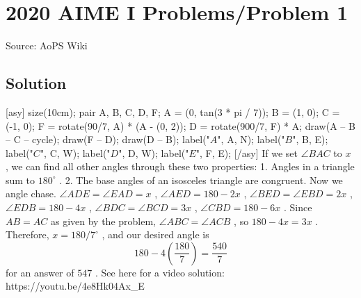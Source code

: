 \documentclass[12pt]{article}
\begin{document}
\section*{{2020 AIME I Problems/Problem 1}}
Source: AoPS Wiki

\subsection*{Solution}
[asy] size(10cm); pair A, B, C, D, F; A = (0, tan(3 * pi / 7)); B = (1, 0); C = (-1, 0); F = rotate(90/7, A) * (A - (0, 2)); D = rotate(900/7, F) * A; draw(A -- B -- C -- cycle); draw(F -- D); draw(D -- B); label("$A$", A, N); label("$B$", B, E); label("$C$", C, W); label("$D$", D, W); label("$E$", F, E); [/asy] If we set $\angle{BAC}$ to $x$ , we can find all other angles through these two properties:
1. Angles in a triangle sum to $180^{\circ}$ .
2. The base angles of an isosceles triangle are congruent. Now we angle chase. $\angle{ADE}=\angle{EAD}=x$ , $\angle{AED} = 180-2x$ , $\angle{BED}=\angle{EBD}=2x$ , $\angle{EDB} = 180-4x$ , $\angle{BDC} = \angle{BCD} = 3x$ , $\angle{CBD} = 180-6x$ . Since $AB = AC$ as given by the problem, $\angle{ABC} = \angle{ACB}$ , so $180-4x=3x$ . Therefore, $x = 180/7^{\circ}$ , and our desired angle is \[180-4\left(\frac{180}{7}\right) = \frac{540}{7}\] for an answer of $\boxed{547}$ . See here for a video solution: https://youtu.be/4e8Hk04Ax_E
\end{document}
